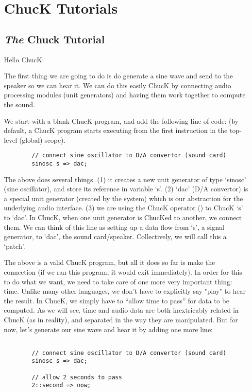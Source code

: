 \chapter{ChucK Tutorials}

\section{{\it The} Chuck Tutorial}
Hello ChucK: 

The first thing we are going to do is do generate a sine wave and send to the speaker so we can hear it. We can do this easily ChucK by connecting audio processing modules (unit generators) and having them work together to compute the sound. 

We start with a blank ChucK program, and add the following line of code: (by default, a ChucK program starts executing from the first instruction in the top-level (global) scope).
\begin{verbatim}
        // connect sine oscillator to D/A convertor (sound card)
        sinosc s => dac;
\end{verbatim}

The above does several things. (1) it creates a new unit generator of type `sinosc' (sine oscillator), and store its reference in variable `s'. (2) `dac' (D/A convertor) is a special unit generator (created by the system) which is our abstraction for the underlying audio interface. (3) we are using the ChucK operator (\chuckop) to ChucK `s' to `dac'. In ChucK, when one unit generator is ChucKed to another, we connect them. We can think of this line as setting up a data flow from `s', a signal generator, to `dac', the sound card/speaker. Collectively, we will call this a `patch'. 

The above is a valid ChucK program, but all it does so far is make the connection (if we ran this program, it would exit immediately). In order for this to do what we want, we need to take care of one more very important thing: time. Unlike many other languages, we don't have to explicitly say "play" to hear the result. In ChucK, we simply have to ``allow time to pass'' for data to be computed. As we will see, time and audio data are both inextricably related in ChucK (as in reality), and separated in the way they are manipulated. But for now, let's generate our sine wave and hear it by adding one more line:

\begin{verbatim}

        // connect sine oscillator to D/A convertor (sound card)
        sinosc s => dac;

        // allow 2 seconds to pass
        2::second => now;
\end{verbatim}

